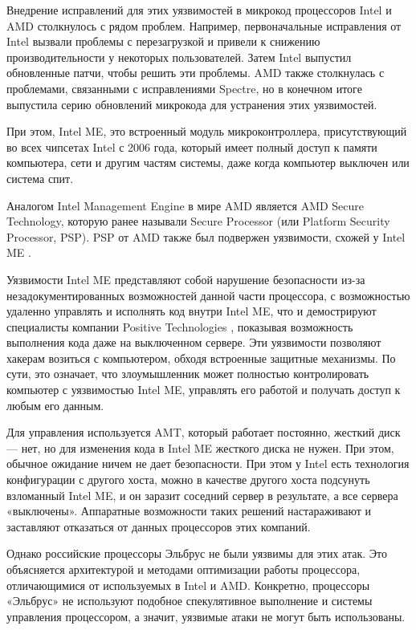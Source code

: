 Внедрение исправлений для этих уязвимостей в микрокод процессоров Intel и AMD столкнулось с рядом проблем. Например, первоначальные исправления от Intel вызвали проблемы с перезагрузкой и привели к снижению производительности у некоторых пользователей. Затем Intel выпустил обновленные патчи, чтобы решить эти проблемы. AMD также столкнулась с проблемами, связанными с исправлениями Spectre, но в конечном итоге выпустила серию обновлений микрокода для устранения этих уязвимостей.

При этом, Intel ME, это встроенный модуль микроконтроллера, присутствующий во всех чипсетах Intel с 2006 года, который имеет полный доступ к памяти компьютера, сети и другим частям системы, даже когда компьютер выключен или система спит.

Аналогом Intel Management Engine в мире AMD является AMD Secure Technology, которую ранее называли Secure Processor (или Platform Security Processor, PSP). PSP от AMD также был подвержен уязвимости, схожей у Intel ME \cite{risk:amdpsp}.

Уязвимости Intel ME представляют собой нарушение безопасности из-за незадокументированных возможностей данной части процессора, с возможностью удаленно управлять и исполнять код внутри Intel ME, что и демострируют специалисты компании Positive Technologies \cite{risk:intelme}, показывая возможность выполнения кода даже на выключенном сервере. Эти уязвимости позволяют хакерам возиться с компьютером, обходя встроенные защитные механизмы. По сути, это означает, что злоумышленник может полностью контролировать компьютер с уязвимостью Intel ME, управлять его работой и получать доступ к любым его данным.

Для управления используется AMT, который работает постоянно, жесткий диск — нет, но для изменения кода в  Intel ME жесткого диска не нужен. При этом, обычное ожидание ничем не дает безопасности. При этом у Intel есть технология конфигурации с другого хоста, можно в качестве другого хоста подсунуть взломанный Intel ME, и он заразит соседний сервер в результате, а все сервера «выключены». Аппаратные возможности таких решений настараживают и заставляют отказаться от данных процессоров этих компаний.

Однако российские процессоры Эльбрус не были уязвимы для этих атак. Это объясняется архитектурой и методами оптимизации работы процессора, отличающимися от используемых в Intel и AMD. Конкретно, процессоры «Эльбрус» не используют подобное спекулятивное выполнение и системы управления процессором, а значит, уязвимые атаки не могут быть использованы. \cite{risk:elbrus_no_spectre}

